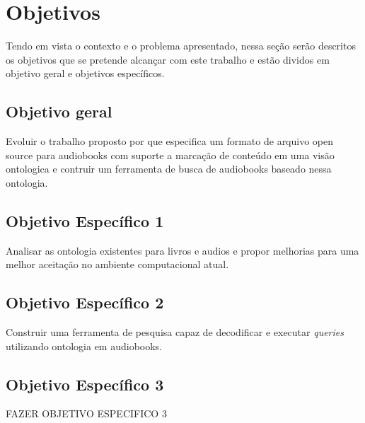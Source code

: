 \chapter{Objetivos}\label{cap2}

Tendo em vista o contexto e o problema apresentado, nessa seção serão descritos os objetivos que se pretende alcançar com este trabalho e estão dividos em objetivo geral e objetivos específicos.

\section{Objetivo geral}

Evoluir o trabalho proposto por \cite{herbert} que especifica um formato de arquivo open source para audiobooks com suporte a marcação de conteúdo em uma visão ontologica e contruir um ferramenta de busca de audiobooks baseado nessa ontologia.

\section{Objetivo Específico 1}

Analisar as ontologia existentes para livros e audios e propor melhorias para uma melhor aceitação no ambiente computacional atual.

\section{Objetivo Específico 2}

Construir uma ferramenta de pesquisa capaz de decodificar e executar \textit{queries} utilizando ontologia em audiobooks.

\section{Objetivo Específico 3}

FAZER OBJETIVO ESPECIFICO 3




 





